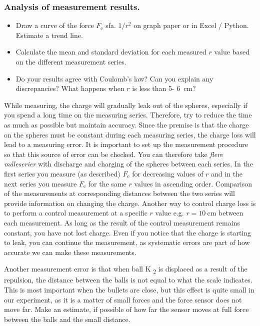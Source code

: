 \documentclass[../Elmag-labhefte-2020.tex]{subfiles}
\begin{document}
\begin{itemize}
\subsubsection{Analysis of measurement results.}
\vspace{-4mm}
\begin{itemize}
    \item Draw a curve of the force $F_\text{e}$ sfa. $1/r^2$ on graph paper or in Excel / Python. Estimate a trend line.
    \item Calculate the mean and standard deviation for each measured $r$ value based on the different measurement series.
    \item Do your results agree with Coulomb's law? Can you explain any discrepancies? What happens when $r$ is less than 5- \SI{6}{\cm}?
\end{itemize}


While measuring, the charge will gradually leak out of the spheres, especially if you spend a long time on the measuring series. Therefore, try to reduce the time as much as possible but maintain accuracy. Since the premise is that the charge on the spheres must be constant during each measuring series, the charge loss will lead to a measuring error. It is important to set up the measurement procedure so that this source of error can be checked. You can therefore take \emph{flere måleserier} with discharge and charging of the spheres between each series. In the first series you measure (as described) $F_\text{e}$ for decreasing values   of $r$ and in the next series you measure $F_\text{e}$ for the same $r$ values   in ascending order. Comparison of the measurements at corresponding distances between the two series will provide information on changing the charge. Another way to control charge loss is to perform a control measurement at a specific $r$ value e.g. $r = \SI{10}{\cm}$ between each measurement. As long as the result of the control measurement remains constant, you have not lost charge. Even if you notice that the charge is starting to leak, you can continue the measurement, as systematic errors are part of how accurate we can make these measurements.

Another measurement error is that when ball K \textsubscript{2} is displaced as a result of the repulsion, the distance between the balls is not equal to what the scale indicates. This is most important when the bullets are close, but this effect is quite small in our experiment, as it is a matter of small forces and the force sensor does not move far. Make an estimate, if possible of how far the sensor moves at full force between the balls and the small distance.


\end{itemize}
\end{document}
